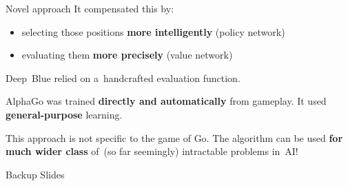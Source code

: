 \documentclass{beamer}
\begin{document}
{\begin{frame}{Novel approach}
      It compensated this by:
      \begin{itemize}[<+- | alert@+>]
        \item selecting those positions \textbf{more intelligently} (policy network)
        \item evaluating them \textbf{more precisely} (value network)
      \end{itemize}
      \pause

      Deep~Blue relied on a~handcrafted evaluation function.
      \pause

      AlphaGo was trained \textbf{directly and automatically} from gameplay.
      It used \textbf{general-purpose} learning.
      \pause

      This approach is not specific to the game of Go.
      The algorithm can be used \textbf{for much wider class} of~(so far seemingly) intractable problems in~AI!
    \end{frame}
  }
  

  \appendix
  \begin{frame}[standout]
    Backup Slides
  \end{frame}
\end{document}
